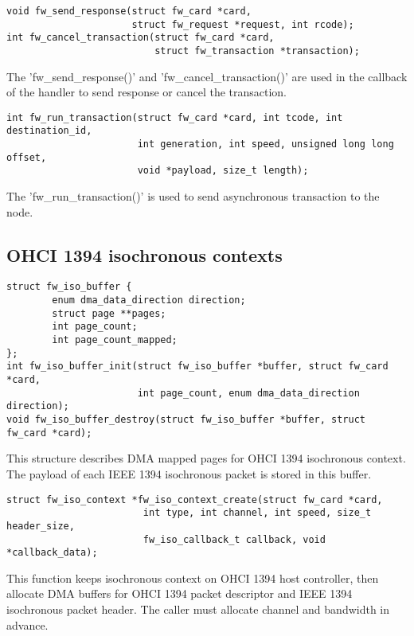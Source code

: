 \documentclass[onecolumn]{article}
\begin{document}
\begin{verbatim}
void fw_send_response(struct fw_card *card,
                      struct fw_request *request, int rcode);
int fw_cancel_transaction(struct fw_card *card,
                          struct fw_transaction *transaction);
\end{verbatim}

The 'fw\_send\_response()' and 'fw\_cancel\_transaction()' are used in the callback of the handler to send response or cancel the transaction.

\begin{verbatim}
int fw_run_transaction(struct fw_card *card, int tcode, int destination_id,
                       int generation, int speed, unsigned long long offset,
                       void *payload, size_t length);
\end{verbatim}

The 'fw\_run\_transaction()' is used to send asynchronous transaction to the node.

\subsection{OHCI 1394 isochronous contexts}

\begin{verbatim}
struct fw_iso_buffer {
        enum dma_data_direction direction;
        struct page **pages;
        int page_count;
        int page_count_mapped;
};
int fw_iso_buffer_init(struct fw_iso_buffer *buffer, struct fw_card *card,
                       int page_count, enum dma_data_direction direction);
void fw_iso_buffer_destroy(struct fw_iso_buffer *buffer, struct fw_card *card);
\end{verbatim}

This structure describes DMA mapped pages for OHCI 1394 isochronous context. The payload of each IEEE 1394 isochronous packet is stored in this buffer. 

\begin{verbatim}
struct fw_iso_context *fw_iso_context_create(struct fw_card *card,
                        int type, int channel, int speed, size_t header_size,
                        fw_iso_callback_t callback, void *callback_data);
\end{verbatim}

This function keeps isochronous context on OHCI 1394 host controller, then allocate DMA buffers for OHCI 1394 packet descriptor and IEEE 1394 isochronous packet header. The caller must allocate channel and bandwidth in advance.
\end{document}
